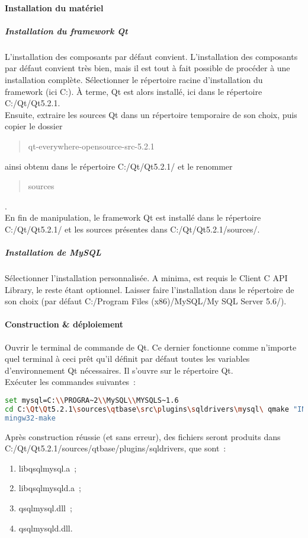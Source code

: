 \paragraph{Installation du matériel}
\subparagraph{Installation du framework Qt}
L'installation des composants par défaut convient.
L'installation des composants par défaut convient très bien, mais il est tout à fait possible de procéder à une installation complète.
Sélectionner le répertoire racine d'installation du framework (ici C:).
À terme, Qt est alors installé, ici dans le répertoire C:/Qt/Qt5.2.1.
\\
Ensuite, extraire les sources Qt dans un répertoire temporaire de son choix, puis copier le dossier \begin{quote}qt-everywhere-opensource-src-5.2.1\end{quote} ainsi obtenu dans le répertoire C:/Qt/Qt5.2.1/ et le renommer \begin{quote}sources\end{quote}.
\\
En fin de manipulation, le framework Qt est installé dans le répertoire C:/Qt/Qt5.2.1/ et les sources présentes dans C:/Qt/Qt5.2.1/sources/.

\subparagraph{Installation de MySQL}
Sélectionner l'installation personnalisée.
A minima, est requis le {\quote Client C API Library}, le reste étant optionnel.
Laisser faire l'installation dans le répertoire de son choix (par défaut C:/Program Files (x86)/MySQL/My SQL Server 5.6/).

\paragraph{Construction \& déploiement}
Ouvrir le terminal de commande de Qt.
Ce dernier fonctionne comme n'importe quel terminal à ceci prêt qu'il définit par défaut toutes les variables d'environnement Qt nécessaires.
Il s'ouvre sur le répertoire Qt.
\\
Exécuter les commandes suivantes~:
\begin{lstlisting}[language=Bash]
set mysql=C:\\PROGRA~2\\MySQL\\MYSQLS~1.6
cd C:\Qt\Qt5.2.1\sources\qtbase\src\plugins\sqldrivers\mysql\ qmake "INCLUDEPATH+=%mysql%\" "LIBS+=%mysql%\\lib\\libmysql.lib" -o Makefile mysql.pro
mingw32-make
\end{lstlisting}
Après construction réussie (et sans erreur), des fichiers seront produits dans C:/Qt/Qt5.2.1/sources/qtbase/plugins/sqldrivers, que sont~:
\begin{enumerate}
	\item libqsqlmysql.a~;
	\item libqsqlmysqld.a~;
	\item qsqlmysql.dll~;
	\item qsqlmysqld.dll.
\end{enumerate}

